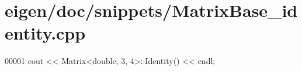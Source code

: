 \hypertarget{eigen_2doc_2snippets_2_matrix_base__identity_8cpp_source}{}\section{eigen/doc/snippets/\+Matrix\+Base\+\_\+identity.cpp}
\label{eigen_2doc_2snippets_2_matrix_base__identity_8cpp_source}

\begin{DoxyCode}
00001 cout << Matrix<double, 3, 4>::Identity() << endl;
\end{DoxyCode}
